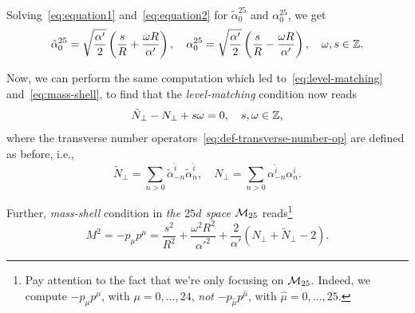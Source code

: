 Solving~\eqref{eq:equation1} and~\eqref{eq:equation2} for $\tilde{\alpha}^{25}_0$ and ${\alpha}^{25}_0$, we get
\begin{equation}
    \tilde{\alpha}^{25}_0 = \sqrt{\frac{\alpha'}{2}} \left( \frac{s}{R} + \frac{\omega R}{\alpha'} \right), \quad {\alpha}^{25}_0 = \sqrt{\frac{\alpha'}{2}} \left( \frac{s}{R} - \frac{\omega R}{\alpha'} \right), \quad \omega, s \in \mathbb{Z}.
\end{equation}

Now, we can perform the same computation which led to~\eqref{eq:level-matching} and~\eqref{eq:mass-shell}, to find that the \emph{level-matching} condition now reads
\begin{equation}\label{eq:comp-level-matrching}
    \tilde{N}_\perp - N_\perp + s \omega = 0, \quad s,\omega \in \mathbb{Z},
\end{equation}
where the transverse number operators~\eqref{eq:def-transverse-number-op} are defined as before, i.e.,
\begin{equation}\label{eq:equation3}
    \tilde{N}_\perp = \sum_{n> 0} \tilde{\alpha}^{\hat{i}}_{-n}\tilde{\alpha}^{\hat{i}}_n, \quad N_\perp = \sum_{n>  0} \alpha^{\hat{i}}_{-n}\alpha^{\hat{i}}_n.
\end{equation}

Further, \emph{mass-shell} condition in \emph{the $25d$ space $\mathcal{M}_{25}$} reads\footnote{Pay attention to the fact that we're only focusing on $\mathcal{M}_{25}$. Indeed, we compute $-p_\mu p^\mu$, with $\mu = 0, \dots, 24$, \emph{not} $-p_{\hat{\mu}}p^{\hat{\mu}}$, with $\hat{\mu} = 0, \dots, 25$.}
\begin{equation}\label{eq:comp-mass-shell}
    M^2 = - p_\mu p^\mu = \frac{s^2}{R^2} + \frac{\omega^2 R^2}{\alpha'^2} + \frac{2}{\alpha'} (N_\perp + \tilde{N}_\perp - 2) .
\end{equation}

